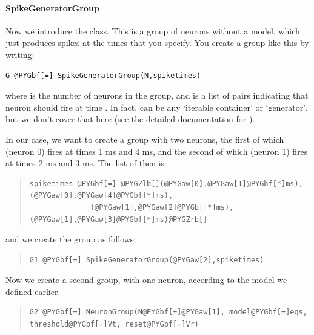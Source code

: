 \documentclass[letterpaper,10pt,english]{manual}
\begin{document}
\paragraph{SpikeGeneratorGroup}

Now we introduce the \hyperlink{brian.SpikeGeneratorGroup}{} class. This is a group of
neurons without a model, which just produces spikes at the times
that you specify. You create a group like this by writing:

\begin{Verbatim}[commandchars=@\[\]]
G @PYGbf[=] SpikeGeneratorGroup(N,spiketimes)
\end{Verbatim}

where  is the number of neurons in the group, and  is a
list of pairs  indicating that neuron  should fire at time .
In fact,  can be any `iterable container' or `generator',
but we don't cover that here (see the detailed documentation for
\hyperlink{brian.SpikeGeneratorGroup}{}).

In our case, we want to create a group with two neurons, the first
of which (neuron 0) fires at times 1 ms and 4 ms, and the second
of which (neuron 1) fires at times 2 ms and 3 ms. The list of
 then is:
\begin{quote}

\begin{Verbatim}[commandchars=@\[\]]
spiketimes @PYGbf[=] @PYGZlb[](@PYGaw[0],@PYGaw[1]@PYGbf[*]ms), (@PYGaw[0],@PYGaw[4]@PYGbf[*]ms),
              (@PYGaw[1],@PYGaw[2]@PYGbf[*]ms), (@PYGaw[1],@PYGaw[3]@PYGbf[*]ms)@PYGZrb[]
\end{Verbatim}
\end{quote}

and we create the group as follows:
\begin{quote}

\begin{Verbatim}[commandchars=@\[\]]
G1 @PYGbf[=] SpikeGeneratorGroup(@PYGaw[2],spiketimes)
\end{Verbatim}
\end{quote}

Now we create a second group, with one neuron, according to the
model we defined earlier.
\begin{quote}

\begin{Verbatim}[commandchars=@\[\]]
G2 @PYGbf[=] NeuronGroup(N@PYGbf[=]@PYGaw[1], model@PYGbf[=]eqs, threshold@PYGbf[=]Vt, reset@PYGbf[=]Vr)
\end{Verbatim}
\end{quote}
\end{document}
